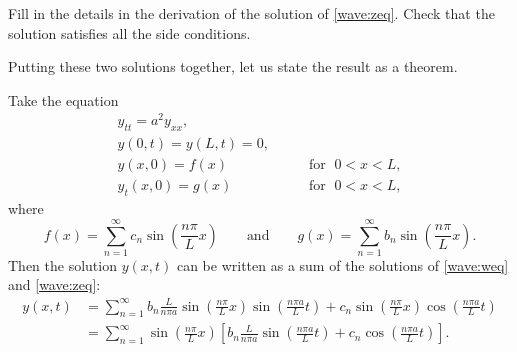 \begin{exercise}
Fill in the details in the derivation of the solution of \eqref{wave:zeq}.
Check that the solution satisfies all the side conditions.
\end{exercise}

Putting these two solutions together, let us state the result as a theorem.
\begin{theorem}
Take the equation
\begin{equation} \label{wave:tyeq}
\begin{array}{ll}
y_{tt} = a^2 y_{xx} , &  \\
y(0,t) = y(L,t) = 0 , &  \\
y(x,0) = f(x) & \qquad \text{for } \; 0 < x < L , \\
y_t(x,0) = g(x) & \qquad \text{for } \; 0 < x < L ,
\end{array}
\end{equation}
where
\begin{equation*}
f(x) =
\sum_{n=1}^\infty c_n \sin \left( \frac{n \pi}{L} x \right)
\qquad \text{and} \qquad
g(x) =
\sum_{n=1}^\infty b_n \sin \left( \frac{n \pi}{L} x \right) .
\end{equation*}
Then the solution $y(x,t)$ can be written as a sum of the solutions
of \eqref{wave:weq} and \eqref{wave:zeq}:
\begin{equation*}
\boxed{~~
\begin{aligned}
y(x,t)
& =
\sum_{n=1}^\infty
b_n
\frac{L}{n \pi a}
\sin \left( \frac{n \pi}{L} x \right)
\sin \left( \frac{n \pi a}{L} t \right) 
+
c_n
\sin \left( \frac{n \pi}{L} x \right)
\cos \left( \frac{n \pi a}{L} t \right) 
\\
& =
\sum_{n=1}^\infty
\sin \left( \frac{n \pi}{L} x \right)
\left[
b_n
\frac{L}{n \pi a}
\sin \left( \frac{n \pi a}{L} t \right) 
+
c_n
\cos \left( \frac{n \pi a}{L} t \right) 
\right] .
\end{aligned}
~~}
\end{equation*}
\end{theorem}

